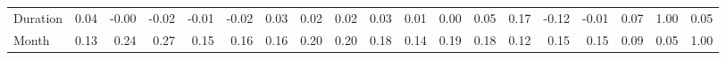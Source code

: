 \begin{tabular}{lrrrrrrrrrrrrrrrrrr}
Duration            &       0.04 &      -0.00 &     -0.02 &     -0.01 &     -0.02 &               0.03 &              0.02 &                 0.02 &                0.03 &         0.01 &         0.00 &     0.05 &           0.17 &   -0.12 &     -0.01 &    0.07 &      1.00 &   0.05 \\
Month               &       0.13 &       0.24 &      0.27 &      0.15 &      0.16 &               0.16 &              0.20 &                 0.20 &                0.18 &         0.14 &         0.19 &     0.18 &           0.12 &    0.15 &      0.15 &    0.09 &      0.05 &   1.00 \\
\bottomrule
\end{tabular}

